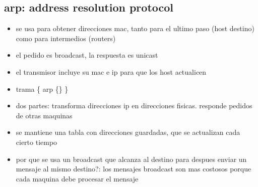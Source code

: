 \documentclass[11pt]{article}
\begin{document}
\subsection{arp: address resolution protocol}
\label{sec:org24245e1}
\begin{itemize}
\item se usa para obtener direcciones mac, tanto para el ultimo paso (host destino) como para intermedios (routers)
\item el pedido es broadcast, la respuesta es unicast
\item el transmisor incluye su mac e ip para que los host actualicen
\item trama \{ arp \{\} \}
\item dos partes: transforma direcciones ip en direcciones fisicas. responde pedidos de otras maquinas
\item se mantiene una tabla con direcciones guardadas, que se actualizan cada cierto tiempo
\item por que se usa un broadcast que alcanza al destino para despues enviar un mensaje al mismo destino?: los mensajes broadcast son mas costosos porque cada maquina debe procesar el mensaje
\end{itemize}
\end{document}
